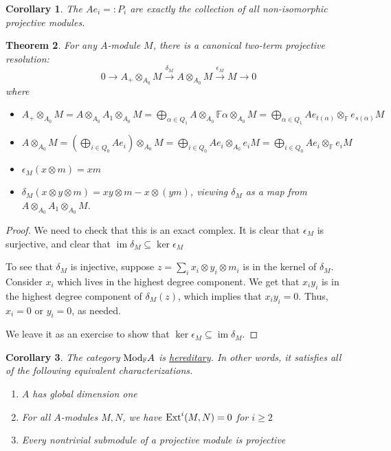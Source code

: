 \documentclass{book}
\newtheorem{theorem}{Theorem}[section]
\newtheorem{corollary}[theorem]{Corollary}
\DeclareMathOperator{\im}{im}
\begin{document}
\begin{corollary}
The $Ae_i=:P_i$ are exactly the collection of all non-isomorphic projective modules.
\end{corollary}

\begin{theorem}
For any $A$-module $M$, there is a canonical two-term projective resolution:
$$
0\longrightarrow A_{+}\otimes_{A_0}M\overset{\delta_M}\longrightarrow A\otimes_{A_0}M\overset{\epsilon_M}\longrightarrow M\longrightarrow 0
$$
where
\begin{itemize}
\item $A_{+}\otimes_{A_0}M=A\otimes_{A_0}A_1\otimes_{A_0}M=\bigoplus_{\alpha\in Q_1} A\otimes_{A_0}\mathbb{F}\alpha\otimes_{A_0}M=\bigoplus_{\alpha\in Q_1} Ae_{t(\alpha)}\otimes_{\mathbb{F}} e_{s(\alpha)}M$

\item $A\otimes_{A_0}M=\left( \bigoplus_{i\in Q_0} Ae_i\right)\otimes_{A_0}M=\bigoplus_{i\in Q_0}Ae_i\otimes_{A_0}e_iM=\bigoplus_{i\in Q_0}Ae_i\otimes_{\mathbb{F}}e_iM$

\item $\epsilon_M(x\otimes m)=xm$

\item $\delta_M(x\otimes y \otimes m)=xy\otimes m - x\otimes (ym)$, viewing $\delta_M$ as a map from $A\otimes_{A_0}A_1\otimes_{A_0}M$.
\end{itemize}
\end{theorem}

\begin{proof}
We need to check that this is an exact complex. It is clear that $\epsilon_M$ is surjective, and clear that $\im \delta_M \subseteq \ker \epsilon_M$

To see that $\delta_M$ is injective, suppose $z=\sum_i x_i\otimes y_i \otimes m_i$ is in the kernel of $\delta_M$. Consider $x_i$ which lives in the highest degree component. We get that $x_iy_i$ is in the highest degree component of $\delta_M(z)$, which implies that $x_iy_i=0$. Thus, $x_i=0$ or $y_i=0$, as needed.

We leave it as an exercise to show that $\ker \epsilon_M \subseteq \im \delta_M$.
\end{proof}

\begin{corollary}
The category $\textnormal{Mod}_{\mathbb{F}}A$ is \underline{hereditary}. In other words, it satisfies all of the following equivalent characterizations.
\begin{enumerate}
\item $A$ has global dimension one

\item For all $A$-modules $M,N$, we have $\textnormal{Ext}^i(M,N)=0$ for $i\geq 2$

\item Every nontrivial submodule of a projective module is projective
\end{enumerate}
\end{corollary}
\end{document}
